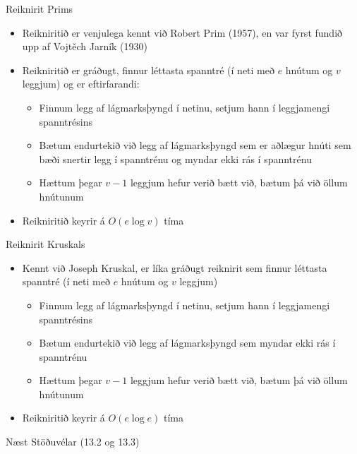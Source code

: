 \documentclass[handout]{beamer}
\begin{document}
\begin{frame}{Reiknirit Prims}
\begin{itemize}
 \item Reikniritið er venjulega kennt við Robert Prim (1957), en var fyrst fundið upp af Vojtěch Jarník (1930)
 \item Reikniritið er gráðugt, finnur léttasta spanntré (í neti með $e$ hnútum og $v$ leggjum) og er eftirfarandi:
 \begin{itemize}
  \item Finnum legg af lágmarksþyngd í netinu, setjum hann í leggjamengi spanntrésins
  \item Bætum endurtekið við legg af lágmarksþyngd sem er aðlægur hnúti sem bæði snertir legg í spanntrénu og myndar ekki rás í spanntrénu
  \item Hættum þegar $v-1$ leggjum hefur verið bætt við, bætum þá við öllum hnútunum
 \end{itemize}
 \item Reikniritið keyrir á $O(e \log v)$ tíma
\end{itemize}
\end{frame}

\begin{frame}{Reiknirit Kruskals}
\begin{itemize}
 \item Kennt við Joseph Kruskal, er líka gráðugt reiknirit sem finnur léttasta spanntré (í neti með $e$ hnútum og $v$ leggjum)
 \begin{itemize}
  \item Finnum legg af lágmarksþyngd í netinu, setjum hann í leggjamengi spanntrésins
  \item Bætum endurtekið við legg af lágmarksþyngd sem myndar ekki rás í spanntrénu
  \item Hættum þegar $v-1$ leggjum hefur verið bætt við, bætum þá við öllum hnútunum
 \end{itemize}
 \item Reikniritið keyrir á $O(e \log e)$ tíma
\end{itemize}
\end{frame}

\begin{frame}{Næst}
Stöðuvélar (13.2 og 13.3)
\end{frame}
\end{document}
